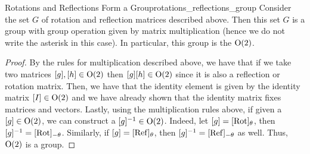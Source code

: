             \begin{prop}{Rotations and Reflections Form a Group}{rotations_reflections_group}
                Consider the set $G$ of rotation and reflection matrices described above.  Then this set $G$ is a group with group operation given by matrix multiplication (hence we do not write the asterisk in this case). In particular, this group is the  $\mathrm{O}(2)$.  
                \tcblower
                \begin{proof}
                By the rules for multiplication described above, we have that if we take two matrices $[g],[h]\in \mathrm{O}(2)$ then $[g][h]\in \mathrm{O}(2)$ since it is also a reflection or rotation matrix.  Then, we have that the identity element is given by the identity matrix $[I]\in \mathrm{O}(2)$ and we have already shown that the identity matrix fixes matrices and vectors.  Lastly, using the multiplication rules above, if given a $[g]\in \mathrm{O}(2)$, we can construct a $[g]^{-1} \in \mathrm{O}(2)$. Indeed, let $[g]=[\mathrm{Rot}]_\theta$, then $[g]^{-1}=[\mathrm{Rot}]_{-\theta}$.  Similarly, if $[g]=[\mathrm{Ref}]_\theta$, then $[g]^{-1}=[\mathrm{Ref}]_{-\theta}$ as well.  Thus, $\mathrm{O}(2)$ is a group.
                \end{proof}
            \end{prop}
            
